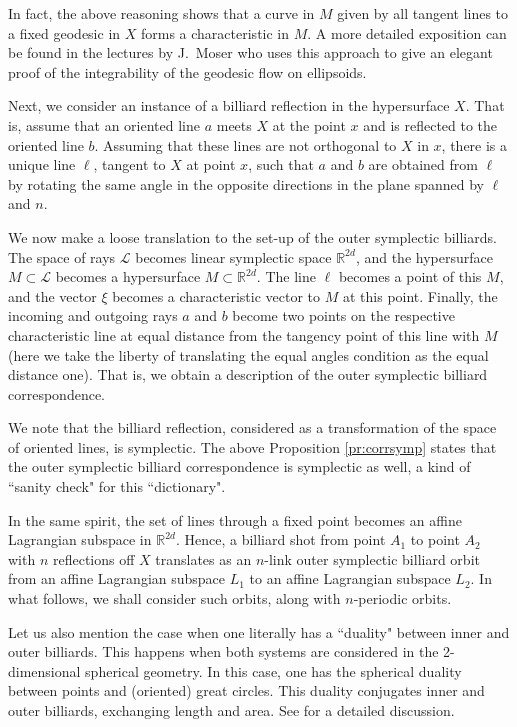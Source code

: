 \documentclass[12pt]{article}
\newcommand{\R}{{\mathbb R}}
\begin{document}
In fact, the above reasoning shows that a curve in $M$ given by all tangent lines to a fixed geodesic in $X$ forms a characteristic in $M$. A more detailed exposition can be found in the lectures by J.~Moser \cite{Mo3} who uses this approach to give an elegant proof of the integrability of the geodesic flow on ellipsoids. 


Next, we consider an instance of a billiard reflection in the hypersurface $X$. That is, assume that an oriented line $a$ meets $X$ at the point $x$ and is reflected to the oriented line $b$. Assuming that these lines are not orthogonal to $X$ in $x$, there is a unique line $\ell$, tangent to $X$ at point $x$, such that $a$ and $b$ are obtained from $\ell$ by rotating the same angle in the opposite directions in the plane spanned by $\ell$ and $n$. 

We now make a loose translation to the set-up of the outer symplectic billiards. The space of rays ${\mathcal L}$ becomes linear symplectic space $\R^{2d}$, and the hypersurface $M \subset {\mathcal L}$ becomes a hypersurface $M \subset \R^{2d}$. The line $\ell$ becomes a point of this $M$, and the vector $\xi$ becomes a characteristic vector to $M$ at this point. Finally, the incoming and outgoing rays $a$ and $b$ become two points on the respective characteristic line at equal distance from the tangency point of this line with $M$ (here we take the liberty of translating the equal angles condition as the equal distance one). That is, we obtain a description of the outer symplectic billiard correspondence.  

We note that the billiard reflection, considered as a transformation of the space of oriented lines, is symplectic. The above Proposition \ref{pr:corrsymp} states that the outer symplectic billiard correspondence is symplectic as well, a kind of ``sanity check" for this ``dictionary".
 
In the same spirit, the set of lines through a fixed point becomes an affine Lagrangian subspace in $\R^{2d}$. Hence, a billiard shot from point $A_1$ to point $A_2$ with $n$ reflections off $X$ translates as an $n$-link outer symplectic billiard orbit from an affine Lagrangian subspace $L_1$ to an affine Lagrangian subspace $L_2$. In what follows, we shall consider such orbits, along with $n$-periodic orbits. 

Let us also mention the case when one literally has a ``duality" between inner and outer billiards. This happens when both systems are considered in the 2-dimensional spherical geometry. In this case, one has the spherical duality between points and (oriented) great circles. This duality conjugates inner and outer billiards, exchanging length and area. See \cite{Ta1,Ta} for a detailed discussion. 
\end{document}
